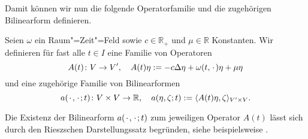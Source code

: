\documentclass[../main.tex]{subfiles}
\begin{document}
Damit können wir nun die folgende Operatorfamilie und die zugehörigen Bilinearform definieren.

\begin{Definition}
\label{definition:operator_bilinearform_zeit}
    Seien $\omega$ ein Raum"=Zeit"=Feld sowie $c \in \mathbb{R}_{+}$ und $\mu \in \mathbb{R}$ Konstanten.
    Wir definieren für fast alle $t \in I$ eine Familie von Operatoren
    \begin{equation}
        \label{eq:operator_zeit}
        A(t) \colon V \to V', \quad  A(t) \eta := - c \Delta \eta + \omega(t, {\mkern2mu\cdot\mkern2mu}) \eta + \mu \eta
    \end{equation}
    und eine zugehörige Familie von Bilinearformen
    \begin{equation}
        \label{eq:bilinearform_zeit}
        a({\mkern2mu\cdot\mkern2mu}, {\mkern2mu\cdot\mkern2mu}; t) \colon V \times V \to \mathbb{R}, \quad  a(\eta, \zeta; t) := \langle A(t)\eta,\zeta\rangle_{V' \times V}.
    \end{equation}
\end{Definition}

\begin{Bemerkung}
\label{bemerkung:operator_bilinearform_riesz}
    Die Existenz der Bilinearform $a({\mkern2mu\cdot\mkern2mu}, {\mkern2mu\cdot\mkern2mu}; t)$ zum jeweiligen Operator $A(t)$ lässt sich durch den Rieszschen Darstellungssatz begründen, siehe beispielsweise \cite[Theorem \S{}22.1]{Halmos:1957vd}.
\end{Bemerkung}
\end{document}
